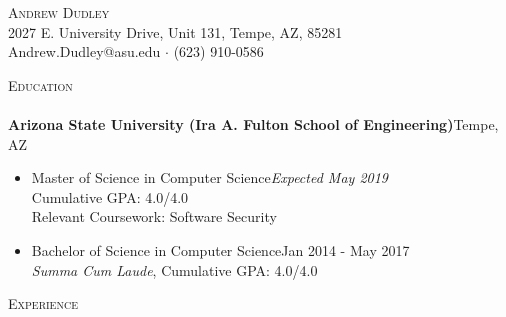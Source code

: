 \documentclass[a4paper]{article}
\newcommand{\lineunder} {
    \vspace*{-8pt} \\
    \hspace*{-18pt} \hrulefill \\
}
\newcommand{\header} [1] {
    {\hspace*{-18pt}\vspace*{6pt} \textsc{#1}}
    \vspace*{-6pt} \lineunder
}
\begin{document}
\vspace*{-40pt}

\vspace*{-10pt}
\begin{center}
	{\Huge \scshape {Andrew Dudley}}\\
    2027 E. University Drive, Unit 131, Tempe, AZ, 85281\\
    Andrew.Dudley@asu.edu $\cdot$ (623) 910-0586\\

\end{center}

\vspace*{1mm}

\header{Education}

\vspace{2mm}
\textbf{Arizona State University (Ira A. Fulton School of Engineering)}\hfill Tempe, AZ\\
    \begin{itemize}
        \item Master of Science in Computer Science\hfill \textit{Expected May 2019} \\
            Cumulative GPA: 4.0/4.0\\
			Relevant Coursework: Software Security
        \item Bachelor of Science in Computer Science\hfill Jan 2014 - May 2017\\
            \textit{Summa Cum Laude}, Cumulative GPA: 4.0/4.0
    \end{itemize}

\header{Experience}
\vspace{1mm}
\end{document}
